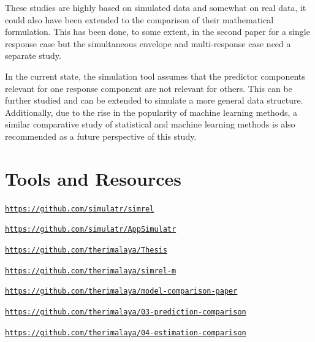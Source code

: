 \documentclass[11pt,twoside,openright,titlepage,
  headinclude,footinclude,BCOR=5mm,
  numbers=noenddot,cleardoublepage=empty,
  tablecaptionabove, dottedtoc,
  bibliography=totoc,paper=a4]{scrreprt}
\providecommand{\tightlist}{%
  \setlength{\itemsep}{0pt}\setlength{\parskip}{0pt}}
\begin{document}
These studies are highly based on simulated data and somewhat on real data, it could also have been extended to the comparison of their mathematical formulation. This has been done, to some extent, in the second paper for a single response case but the simultaneous envelope and multi-response case need a separate study.

In the current state, the simulation tool assumes that the predictor components relevant for one response component are not relevant for others. This can be further studied and can be extended to simulate a more general data structure. Additionally, due to the rise in the popularity of machine learning methods, a similar comparative study of statistical and machine learning methods is also recommended as a future perspective of this study.

\hypertarget{tools-and-resources}{%
\chapter{Tools and Resources}\label{tools-and-resources}}

\begin{description}
\tightlist
\item[R-package:]
\href{https://github.com/simulatr/simrel}{\linebreak \texttt{https://github.com/simulatr/simrel}}
\item[Shiny Application:]
\href{https://github.com/simulatr/AppSimulatr}{\linebreak \texttt{https://github.com/simulatr/AppSimulatr}}
\item[Thesis GitHub Repository:]
\href{https://github.com/therimalaya/Thesis}{\linebreak \texttt{https://github.com/therimalaya/Thesis}}
\item[Paper 1:]
\href{https://github.com/therimalaya/simrel-m}{\linebreak \texttt{https://github.com/therimalaya/simrel-m}}
\item[Paper 2:]
\href{https://github.com/therimalaya/model-comparison-paper}{\linebreak \texttt{https://github.com/therimalaya/model-comparison-paper}}
\item[Paper 3:]
\href{https://github.com/therimalaya/03-prediction-comparison}{\linebreak \texttt{https://github.com/therimalaya/03-prediction-comparison}}
\item[Paper 4:]
\href{https://github.com/therimalaya/04-estimation-comparison}{\linebreak \texttt{https://github.com/therimalaya/04-estimation-comparison}}
\end{description}
\end{document}
